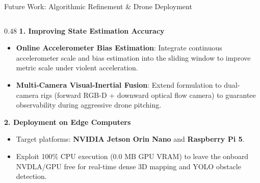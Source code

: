 \documentclass[aspectratio=169, 10pt]{beamer}
\begin{document}
\begin{frame}{Future Work: Algorithmic Refinement \& Drone Deployment}
  \begin{columns}[T]
    \begin{column}{0.48\textwidth}
      {\small \textbf{\textcolor{NavyBlue}{1. Improving State Estimation Accuracy}}}
      \vspace{0.08cm}
      \scriptsize
      \begin{itemize}
        \setlength{\itemsep}{2pt}
        \item \textbf{Online Accelerometer Bias Estimation}: Integrate continuous accelerometer scale and bias estimation into the sliding window to improve metric scale under violent acceleration.
        \item \textbf{Multi-Camera Visual-Inertial Fusion}: Extend formulation to dual-camera rigs (forward RGB-D + downward optical flow camera) to guarantee observability during aggressive drone pitching.
      \end{itemize}
      \vspace{0.15cm}

      {\small \textbf{\textcolor{NavyBlue}{2. Deployment on Edge Computers}}}
      \vspace{0.08cm}
      \scriptsize
      \begin{itemize}
        \setlength{\itemsep}{2pt}
        \item Target platforms: \textbf{NVIDIA Jetson Orin Nano} and \textbf{Raspberry Pi 5}.
        \item Exploit 100\% CPU execution ($0.0\text{ MB}$ GPU VRAM) to leave the onboard NVDLA/GPU free for real-time dense 3D mapping and YOLO obstacle detection.
      \end{itemize}
    \end{column}


\end{columns}
\end{frame}
\end{document}
